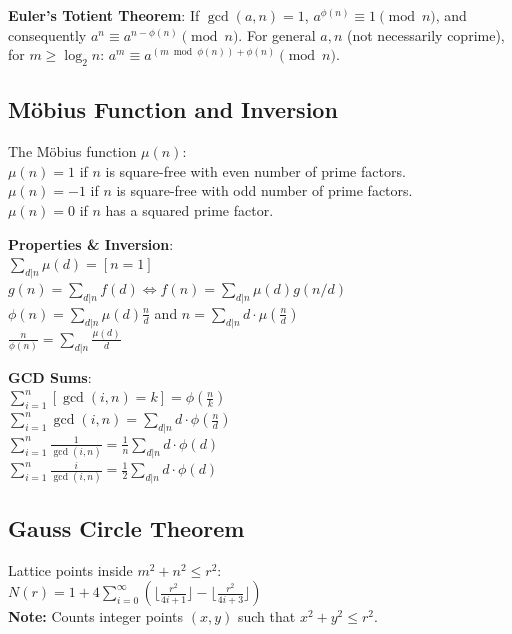 \textbf{Euler's Totient Theorem}: If $\gcd(a,n)=1$, $a^{\phi(n)} \equiv 1 \pmod n$, and consequently $a^n \equiv a^{n-\phi(n)} \pmod n$. For general $a,n$ (not necessarily coprime), for $m \ge \log_2 n$: $a^m \equiv a^{(m \bmod \phi(n)) + \phi(n)} \pmod n$.

\subsection{Möbius Function and Inversion}
The Möbius function $\mu(n)$: \\
\textbullet{} $\mu(n) = 1$ if $n$ is square-free with even number of prime factors. \\
\textbullet{} $\mu(n) = -1$ if $n$ is square-free with odd number of prime factors. \\
\textbullet{} $\mu(n) = 0$ if $n$ has a squared prime factor.

\textbf{Properties \& Inversion}: \\
\textbullet{} $\sum_{d|n} \mu(d) = [n = 1]$ \\
\textbullet{} $g(n) = \sum_{d|n} f(d) \iff f(n) = \sum_{d|n} \mu(d)g(n/d)$ \\
\textbullet{} $\phi(n) = \sum_{d|n} \mu(d) \frac{n}{d}$ and $n = \sum_{d|n} d \cdot \mu\left(\frac{n}{d}\right)$ \\
\textbullet{} $\frac{n}{\phi(n)} = \sum_{d|n} \frac{\mu(d)}{d}$

\textbf{GCD Sums}: \\
\textbullet{} $\sum_{i=1}^n [\gcd(i, n) = k] = \phi\left(\frac{n}{k}\right)$ \\
\textbullet{} $\sum_{i=1}^n \gcd(i, n) = \sum_{d|n} d \cdot \phi\left(\frac{n}{d}\right)$ \\
\textbullet{} $\sum_{i=1}^n \frac{1}{\gcd(i,n)} = \frac{1}{n} \sum_{d|n} d \cdot \phi(d)$ \\
\textbullet{} $\sum_{i=1}^n \frac{i}{\gcd(i,n)} = \frac{1}{2} \sum_{d|n} d \cdot \phi(d)$

\subsection{Gauss Circle Theorem}
Lattice points inside $m^2 + n^2 \le r^2$: \\
$N(r) = 1 + 4 \sum_{i=0}^\infty \left( \lfloor \frac{r^2}{4i+1} \rfloor - \lfloor \frac{r^2}{4i+3} \rfloor \right)$ \\
\textbf{Note:} Counts integer points $(x,y)$ such that $x^2 + y^2 \le r^2$.

